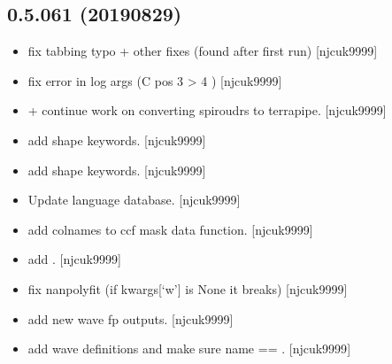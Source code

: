 \documentclass[a4paper,10pt,english]{report}
\begin{document}
\subsection{0.5.061 (2019\sphinxhyphen{}08\sphinxhyphen{}29)}
\label{\detokenize{misc/changelog:id101}}\begin{itemize}
\item {} 
 \sphinxhyphen{} fix tabbing typo + other fixes (found after
first run) {[}njcuk9999{]}

\item {} 
 \sphinxhyphen{} fix error in log args (C  pos 3 \textendash{}\textgreater{} 4 )
{[}njcuk9999{]}

\item {} 
 +  \sphinxhyphen{} continue work on
converting spiroudrs to terrapipe. {[}njcuk9999{]}

\item {} 
 \sphinxhyphen{} add shape keywords. {[}njcuk9999{]}

\item {} 
 \sphinxhyphen{} add shape keywords. {[}njcuk9999{]}

\item {} 
Update language database. {[}njcuk9999{]}

\item {} 
 \sphinxhyphen{} add colnames to ccf mask data function. {[}njcuk9999{]}

\item {} 
 \sphinxhyphen{} add . {[}njcuk9999{]}

\item {} 
 \sphinxhyphen{} fix nanpolyfit (if kwargs{[}‘w’{]} is None it
breaks) {[}njcuk9999{]}

\item {} 
 \sphinxhyphen{} add new wave fp
outputs. {[}njcuk9999{]}

\item {} 
 \sphinxhyphen{} add wave definitions and
make sure name == . {[}njcuk9999{]}


\end{itemize}
\end{document}
